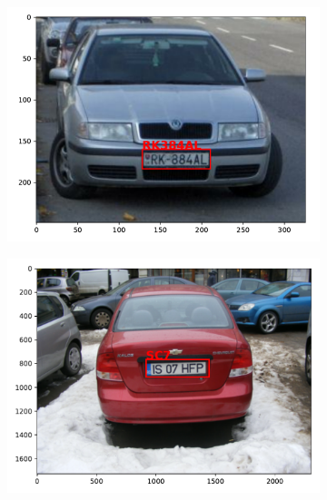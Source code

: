 \begin{figure}
\begin{subfigure}{0.31\textwidth}
        \includegraphics[width=\textwidth]{abbildungen/prediction_03.pdf}
    \end{subfigure}
    \begin{subfigure}{0.31\textwidth}
        \includegraphics[width=\textwidth]{abbildungen/prediction_04.pdf}
    \end{subfigure}
    \begin{subfigure}{0.31\textwidth}

\end{subfigure}
\end{figure}
